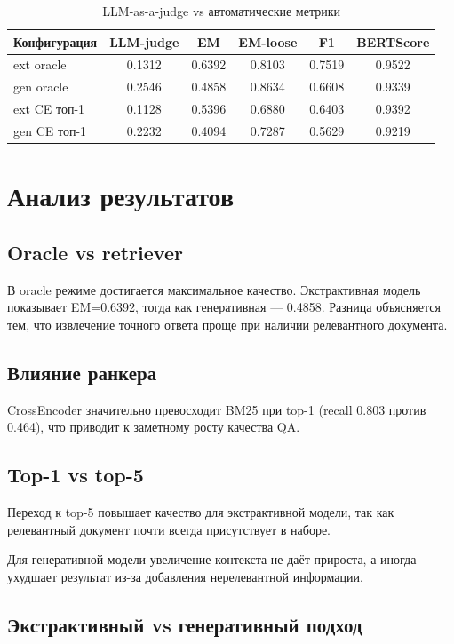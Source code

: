 \documentclass[11pt]{article}
\begin{document}
\begin{table}[t]
\centering
\small
\begin{tabular}{lccccc}
\toprule
Конфигурация & LLM-judge & EM & EM-loose & F1 & BERTScore \\
\midrule
ext oracle   & 0.1312 & 0.6392 & 0.8103 & 0.7519 & 0.9522 \\
gen oracle   & 0.2546 & 0.4858 & 0.8634 & 0.6608 & 0.9339 \\
ext CE топ-1 & 0.1128 & 0.5396 & 0.6880 & 0.6403 & 0.9392 \\
gen CE топ-1 & 0.2232 & 0.4094 & 0.7287 & 0.5629 & 0.9219 \\
\bottomrule
\end{tabular}
\caption{LLM-as-a-judge vs автоматические метрики}
\label{tab:judge}
\end{table}

\section{Анализ результатов}

\subsection{Oracle vs retriever}

В oracle режиме достигается максимальное качество.
Экстрактивная модель показывает EM=0.6392, тогда как генеративная — 0.4858.
Разница объясняется тем, что извлечение точного ответа проще при наличии
релевантного документа.

\subsection{Влияние ранкера}

CrossEncoder значительно превосходит BM25 при top-1 (recall 0.803 против 0.464),
что приводит к заметному росту качества QA.

\subsection{Top-1 vs top-5}

Переход к top-5 повышает качество для экстрактивной модели,
так как релевантный документ почти всегда присутствует в наборе.

Для генеративной модели увеличение контекста не даёт прироста,
а иногда ухудшает результат из-за добавления нерелевантной информации.

\subsection{Экстрактивный vs генеративный подход}
\end{document}
